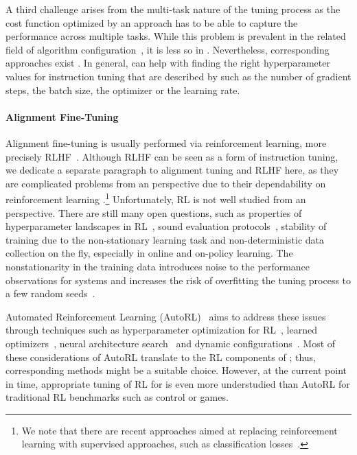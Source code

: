 A third challenge arises from the multi-task nature of the tuning process as the cost function optimized by an \AutoML approach has to be able to capture the performance across multiple tasks.
While this problem is prevalent in the related field of algorithm configuration~\cite{schede-jair22a}, it is less so in \AutoML.
Nevertheless, corresponding approaches exist \cite{perrone-neurips18a,law-neurips19a,li-kdd22a}.
In general, \AutoML can help with finding the right hyperparameter values for instruction tuning that are described by \citet{wei-iclr22a} such as the number of gradient steps, the batch size, the optimizer or the learning rate.

\paragraph{Alignment Fine-Tuning}
Alignment fine-tuning is usually performed via reinforcement learning, more precisely RLHF~\cite{fernandes-arxiv23a}. Although RLHF can be seen as a form of instruction tuning, we dedicate a separate paragraph to alignment tuning and RLHF here, as they are complicated problems from an \AutoML perspective due to their dependability on reinforcement learning \cite{eimer-icml23a}.\footnote{We note that there are recent approaches aimed at replacing reinforcement learning with supervised approaches, such as classification losses~\cite{rafailov-arxiv23a}.}
Unfortunately, RL is not well studied from an \AutoML perspective.
There are still many open questions, such as properties of hyperparameter landscapes in RL~\cite{mohan-automlconf23a}, sound evaluation protocols~\cite{eimer-icml23a}, stability of training due to the non-stationary learning task and non-deterministic data collection on the fly, especially in online and on-policy learning.
The nonstationarity in the training data introduces noise to the performance observations for \AutoML systems and increases the risk of overfitting the tuning process to a few random seeds~\cite{eimer-icml23a}.

Automated Reinforcement Learning (AutoRL)~\cite{parkerholder-jair22a} aims to address these issues through techniques such as hyperparameter optimization for RL~\cite{li-kdd19a,parkerholder-neurips20a,wan-automl22a}, learned optimizers~\cite{lan-arxiv23a}, neural architecture search~\cite{wan-automl22a} and dynamic configurations~\cite{adriaensen-jair22a}.
Most of these considerations of AutoRL translate to the RL components of \LLMs; thus, corresponding methods might be a suitable choice.
However, at the current point in time, appropriate tuning of RL for \LLM is even more understudied than AutoRL for traditional RL benchmarks such as control or games.

